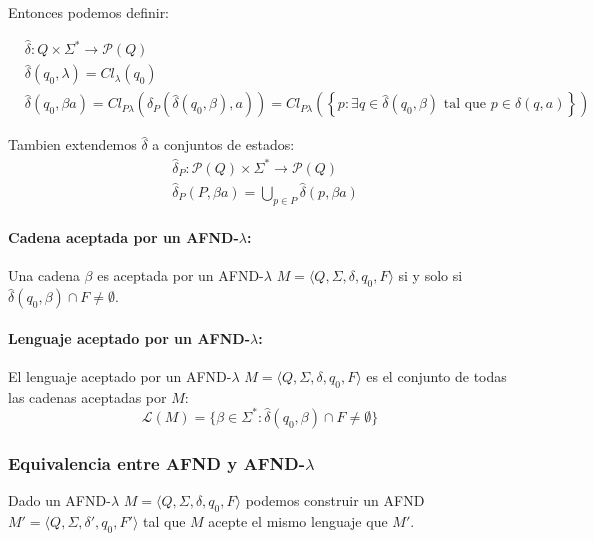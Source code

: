 Entonces podemos definir:

\begin{align*}
   & \hat\delta: Q \times \Sigma^* \to \mathcal{P}(Q)                                                                                                                                                             \\
   & \hat\delta(q_0,\lambda) = Cl_\lambda(q_0)                                                                                                                                                                    \\
   & \hat\delta(q_0, \beta a) = Cl_{P\lambda}\left(\delta_P(\hat\delta(q_0,\beta), a)\right) = Cl_{P\lambda}\left(\left\{ p: \exists q\in \hat\delta(q_0,\beta) \text{ tal que } p\in \delta(q,a) \right\}\right)
\end{align*}

Tambien extendemos \(\hat\delta\) a conjuntos de estados:
\begin{align*}
   & \hat\delta_P: \mathcal{P}(Q) \times \Sigma^* \to \mathcal{P}(Q)  \\
   & \hat\delta_P(P,\beta a) = \bigcup_{p\in P} \hat\delta(p,\beta a)
\end{align*}

\paragraph{Cadena aceptada por un AFND-\(\lambda\):} Una cadena \(\beta\) es aceptada por un AFND-\(\lambda\) \(M =\langle Q,\Sigma,\delta,q_0,F\rangle\) si y solo si \(\hat\delta(q_0,\beta)\cap F \neq \emptyset\).

\paragraph{Lenguaje aceptado por un AFND-\(\lambda\):} El lenguaje aceptado por un AFND-\(\lambda\) \(M =\langle Q,\Sigma,\delta,q_0,F\rangle\) es el conjunto de todas las cadenas aceptadas por \(M\):
\[\mathcal{L}(M) = \{\beta \in \Sigma^* : \hat\delta(q_0,\beta)\cap F \neq \emptyset\}\]

\subsubsection{Equivalencia entre AFND y AFND-\texorpdfstring{\(\lambda\)}{lambda}}
\label{sec:afd-afd-lambda}
Dado un AFND-\(\lambda\) \(M =\langle Q,\Sigma,\delta,q_0,F\rangle\) podemos construir un AFND \(M' =\langle Q,\Sigma,\delta',q_0,F'\rangle\) tal que \(M\) acepte el mismo lenguaje que \(M'\).

